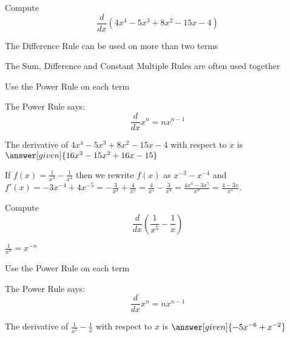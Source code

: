 \documentclass{ximera}
\begin{document}
\begin{problem} %
  Compute 
  \[
  \frac{d}{dx} \left(4x^4 - 5x^3 + 8x^2 - 15x - 4\right)
  \]
  
    \begin{hint}
		  The Difference Rule can be used on more than two terms
		\end{hint}
		\begin{hint}
		  The Sum, Difference and Constant Multiple Rules are often used together 
		\end{hint}
		\begin{hint}
      Use the Power Rule on each term
    \end{hint}
    \begin{hint}
      The Power Rule says:
      \[
      \frac{d}{dx} x^n = nx^{n-1}
      \]
    \end{hint}    
		The derivative of $4x^4 - 5x^3 + 8x^2 - 15x - 4$ with respect to $x$ is
		 $\answer[given]{16x^3 - 15x^2 + 16x - 15}$
	
\end{problem}


\begin{example} %
 If $f(x) = \frac{1}{x^3} - \frac{1}{x^4}$ then we rewrite $f(x)$ as $x^{-3} - x^{-4}$ and 
$f'(x) = -3x^{-4} + 4x^{-5} = -\frac{3}{x^4} + \frac{4}{x^5} = \frac{4}{x^5}-\frac{3}{x^4} = 
\frac{4x^4 - 3x^5}{x^9} = \frac{4 - 3x}{x^5}$.
\end{example}


\begin{problem} %
  Compute 
  \[
  \frac{d}{dx} \left(\frac{1}{x^5} - \frac{1}{x}\right)
  \]
  
    \begin{hint}
		 $\frac{1}{x^n} = x^{-n}$
		\end{hint}
		\begin{hint}
      Use the Power Rule on each term
    \end{hint}
    \begin{hint}
      The Power Rule says:
      \[
      \frac{d}{dx} x^n = nx^{n-1}
      \]
    \end{hint}    
		The derivative of $\frac{1}{x^5} - \frac{1}{x}$ with respect to $x$ is
		 $\answer[given]{-5x^{-6} + x^{-2}}$
	
\end{problem}
\end{document}

